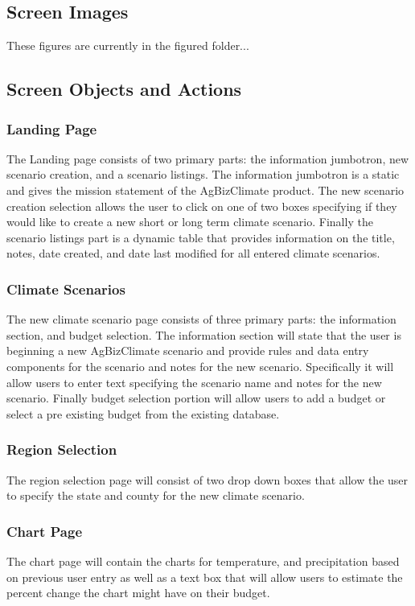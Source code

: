 \documentclass[onecolumn, draftclsnofoot,10pt, compsoc]{article}
\begin{document}
	\subsection{Screen Images}
	These figures are currently in the figured folder...
	\subsection{Screen Objects and Actions}
		\subsubsection{Landing Page}
		The Landing page consists of two primary parts: the information jumbotron, new scenario creation, and a scenario listings. The information jumbotron is a static and gives the mission statement of the AgBizClimate product. The new scenario creation selection allows the user to click on one of two boxes specifying if they would like to create a new short or long term climate scenario. Finally the scenario listings part is a dynamic table that provides information on the title, notes, date created, and date last modified for all entered climate scenarios.
		\subsubsection{Climate Scenarios}
		The new climate scenario page consists of three primary parts: the information section, and budget selection. The information section will state that the user is beginning a new AgBizClimate scenario and provide rules and data entry components for the scenario and notes for the new scenario. Specifically it will allow users to enter text specifying the scenario name and notes for the new scenario. Finally budget selection portion will allow users to add a budget or select a pre existing budget from the existing database.
		\subsubsection{Region Selection}
		The region selection page will consist of two drop down boxes that allow the user to specify the state and county for the new climate scenario.
		\subsubsection{Chart Page}
		The chart page will contain the charts for temperature, and precipitation based on previous user entry as well as a text box that will allow users to estimate the percent change the chart might have on their budget.
\end{document}
